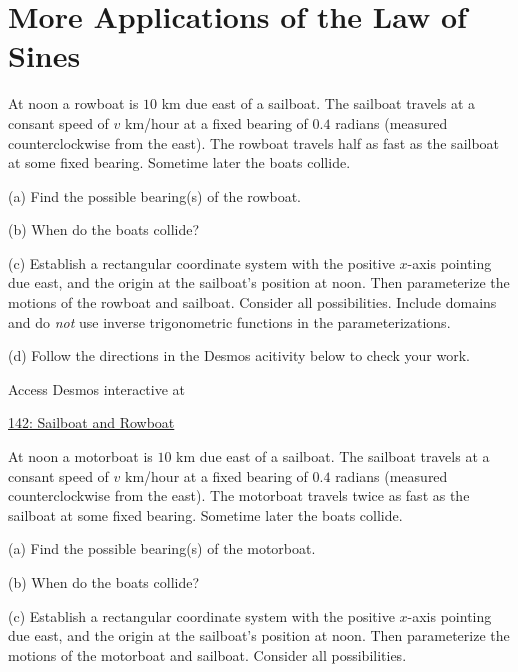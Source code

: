 \documentclass{ximera}
\begin{document}
\section{More Applications of the Law of Sines}
\begin{question}  \label{Q343f44fd}
At noon a rowboat is $10$ km due east of a sailboat. The sailboat travels at a consant speed of $v$ km/hour at a fixed bearing of $0.4$ radians (measured counterclockwise from the east). The rowboat travels half as fast as the sailboat at some fixed bearing. Sometime later the boats collide.

(a) Find the possible bearing(s) of the rowboat.

(b) When do the boats collide?

(c) Establish a rectangular coordinate system with the positive $x$-axis pointing due east, and the origin at the sailboat's position at noon. Then parameterize the motions of the rowboat and sailboat. Consider all possibilities. Include domains and do \emph{not} use inverse trigonometric functions in the parameterizations.

(d) Follow the directions in the Desmos acitivity below to check your work.

 
\begin{onlineOnly}
    \begin{center}
\end{center}
\end{onlineOnly}

Access Desmos interactive at

\href{https://www.desmos.com/calculator/xjiwflhe2o}{142: Sailboat and Rowboat}

\end{question}





\begin{question}  \label{Qercg663}
At noon a motorboat is $10$ km due east of a sailboat. The sailboat travels at a consant speed of $v$ km/hour at a fixed bearing of $0.4$ radians (measured counterclockwise from the east). The motorboat travels twice as fast as the sailboat at some fixed bearing. Sometime later the boats collide.

(a) Find the possible bearing(s) of the motorboat.

(b) When do the boats collide?

(c) Establish a rectangular coordinate system with the positive $x$-axis pointing due east, and the origin at the sailboat's position at noon. Then parameterize the motions of the motorboat and sailboat. Consider all possibilities.

\end{question}
\end{document}
